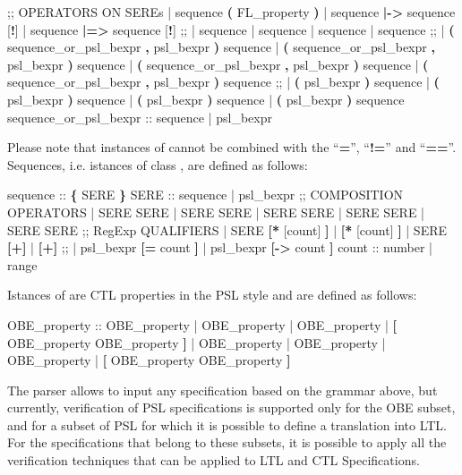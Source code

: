 \begin{Grammar}
 ;; OPERATORS ON SEREs
 | sequence \textbf{(} FL_property \textbf{)}
 | sequence \textbf{|->} sequence [\textbf{!}]
 | sequence \textbf{|=>} sequence [\textbf{!}]
 ;;
 |  sequence
 |  sequence
 |  sequence
 |  sequence
 ;;
 |  \textbf{(} sequence_or_psl_bexpr \textbf{,} psl_bexpr \textbf{)} sequence
 |  \textbf{(} sequence_or_psl_bexpr \textbf{,} psl_bexpr \textbf{)} sequence
 |  \textbf{(} sequence_or_psl_bexpr \textbf{,} psl_bexpr \textbf{)} sequence
 |  \textbf{(} sequence_or_psl_bexpr \textbf{,} psl_bexpr \textbf{)} sequence
 ;;
 |  \textbf{(} psl_bexpr \textbf{)} sequence
 |  \textbf{(} psl_bexpr \textbf{)} sequence
 |  \textbf{(} psl_bexpr \textbf{)} sequence
 |  \textbf{(} psl_bexpr \textbf{)} sequence
sequence_or_psl_bexpr ::
   sequence
 | psl_bexpr
\end{Grammar}
%
Please note that instances of  cannot be combined
with the ``\textbf{=}'', ``\textbf{!=}'' and ``\textbf{==}''.\\
%
Sequences, i.e. istances of class , are defined as follows:
%
\begin{Grammar}
sequence ::
   \textbf{\{} SERE \textbf{\}}
SERE ::
   sequence
 | psl_bexpr
 ;; COMPOSITION OPERATORS
 | SERE \operator{;} SERE
 | SERE \operator{:} SERE
 | SERE \operator{&} SERE
 | SERE \operator{&&} SERE
 | SERE \operator{|} SERE
 ;; RegExp QUALIFIERS
 | SERE \textbf{[*} [count] \textbf{]}
 | \textbf{[*} [count] \textbf{]}
 | SERE \textbf{[+]}
 | \textbf{[+]}
 ;;
 | psl_bexpr \textbf{[=} count \textbf{]}
 | psl_bexpr \textbf{[->} count \textbf{]}
count ::
   number
 | range
\end{Grammar}
%
Istances of  are CTL properties in the PSL style
and are defined as follows:
%
\begin{Grammar}
OBE_property ::
    OBE_property
 |  OBE_property
 |  OBE_property
 |  \textbf{[} OBE_property  OBE_property \textbf{]}
 |  OBE_property
 |  OBE_property
 |  OBE_property
 |  \textbf{[} OBE_property  OBE_property \textbf{]}
\end{Grammar}
%
The \nusmv parser allows to input any specification based on the
grammar above, but currently, verification of PSL specifications is
supported only for the OBE subset, and for a subset of PSL for
which it is possible to define a translation into LTL. For the
specifications that belong to these subsets, it is possible to apply
all the verification techniques that can be applied to LTL and CTL
Specifications.



